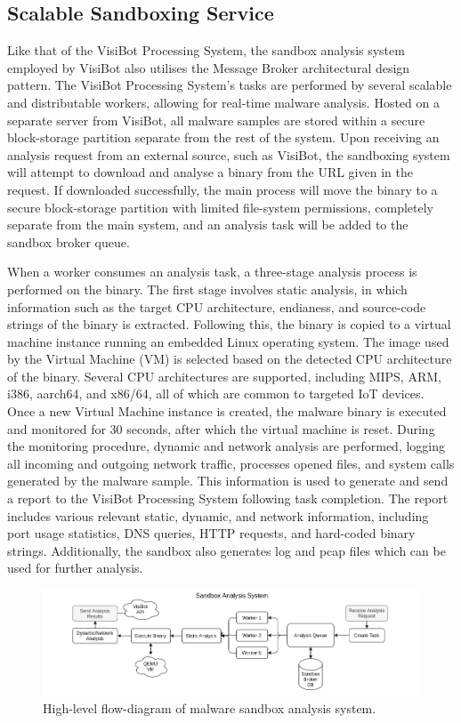 \subsection{Scalable Sandboxing Service}

Like that of the VisiBot Processing System, the sandbox analysis system employed by VisiBot also utilises the Message Broker architectural design pattern. The VisiBot Processing System's tasks are performed by several scalable and distributable workers, allowing for real-time malware analysis. Hosted on a separate server from VisiBot, all malware samples are stored within a secure block-storage partition separate from the rest of the system. Upon receiving an analysis request from an external source, such as VisiBot, the sandboxing system will attempt to download and analyse a binary from the URL given in the request. If downloaded successfully, the main process will move the binary to a secure block-storage partition with limited file-system permissions, completely separate from the main system, and an analysis task will be added to the sandbox broker queue.

When a worker consumes an analysis task, a three-stage analysis process is performed on the binary. The first stage involves static analysis, in which information such as the target CPU architecture, endianess, and source-code strings of the binary is extracted. Following this, the binary is copied to a virtual machine instance running an embedded Linux operating system. The image used by the Virtual Machine (VM) is selected based on the detected CPU architecture of the binary. Several CPU architectures are supported, including MIPS, ARM, i386, aarch64, and x86/64, all of which are common to targeted IoT devices. Once a new Virtual Machine instance is created, the malware binary is executed and monitored for 30 seconds, after which the virtual machine is reset. During the monitoring procedure, dynamic and network analysis are performed, logging all incoming and outgoing network traffic, processes opened files, and system calls generated by the malware sample. This information is used to generate and send a report to the VisiBot Processing System following task completion. The report includes various relevant static, dynamic, and network information, including port usage statistics, DNS queries, HTTP requests, and hard-coded binary strings. Additionally, the sandbox also generates log and pcap files which can be used for further analysis. 

\begin{figure}[!htb]
    \centering
    \includegraphics[width=0.8\linewidth]{flowcharts/high_level_sandbox_overview.png}
    \caption{High-level flow-diagram of malware sandbox analysis system.}
    \label{fig:high_level_sandbox} 
\end{figure}

